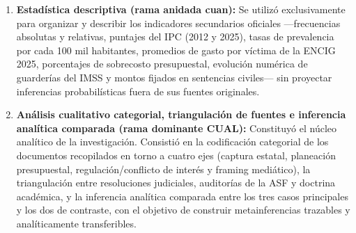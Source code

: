 \begin{enumerate}
  \item \textbf{Estadística descriptiva (rama anidada cuan):} Se utilizó exclusivamente para organizar y describir los indicadores secundarios oficiales ---frecuencias absolutas y relativas, puntajes del IPC (2012 y 2025), tasas de prevalencia por cada 100 mil habitantes, promedios de gasto por víctima de la ENCIG 2025, porcentajes de sobrecosto presupuestal, evolución numérica de guarderías del IMSS y montos fijados en sentencias civiles--- sin proyectar inferencias probabilísticas fuera de sus fuentes originales.
  
  \item \textbf{Análisis cualitativo categorial, triangulación de fuentes e inferencia analítica comparada (rama dominante CUAL):} Constituyó el núcleo analítico de la investigación. Consistió en la codificación categorial de los documentos recopilados en torno a cuatro ejes (captura estatal, planeación presupuestal, regulación/conflicto de interés y framing mediático), la triangulación entre resoluciones judiciales, auditorías de la ASF y doctrina académica, y la inferencia analítica comparada entre los tres casos principales y los dos de contraste, con el objetivo de construir metainferencias trazables y analíticamente transferibles.
\end{enumerate}